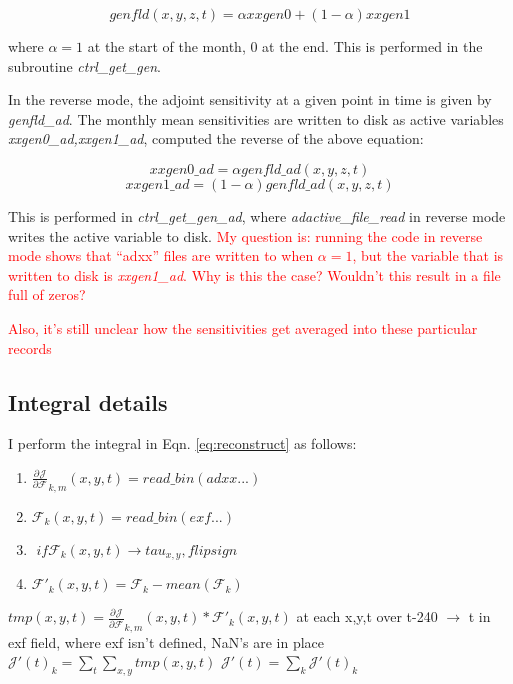 \documentclass[a4paper,11pt]{article}
\newcommand{\pderiv}[3][]{%
  \ensuremath{\frac{\partial^{#1} {#2}}{\partial {#3}^{#1}}}}
\newcommand{\red}[1]{\textcolor{red}{#1}}
\begin{document}
	\begin{equation}
	  genfld(x,y,z,t) = \alpha xxgen0 + (1-\alpha) xxgen1
	\end{equation}

  where $\alpha=1$ at the start of the month, 0 at the end. This is performed in the subroutine \textit{ctrl\_get\_gen}.

  In the reverse mode, the adjoint sensitivity at a given point in time is given by \textit{genfld\_ad}. The monthly mean sensitivities are written to disk as active variables \textit{xxgen0\_ad,xxgen1\_ad}, computed the reverse of the above equation: 

	\begin{equation}
	  xxgen0\_ad = \alpha genfld\_ad(x,y,z,t)
	\end{equation}
	\begin{equation}
	  xxgen1\_ad = (1-\alpha) genfld\_ad(x,y,z,t) 
	\end{equation}

   
  This is performed in \textit{ctrl\_get\_gen\_ad}, where \textit{adactive\_file\_read} in reverse mode writes the active variable to disk. \red{My question is: running the code in reverse mode shows that ``adxx'' files are written to when $\alpha = 1$, but the variable that is written to disk is \textit{xxgen1\_ad}. Why is this the case? Wouldn't this result in a file full of zeros?}

  \red{Also, it's still unclear how the sensitivities get averaged into these particular records}

 \subsection{Integral details} 

  I perform the integral in Eqn. \ref{eq:reconstruct} as follows:

 \begin{algorithm}
 \begin{algorithmic}
    \STATE
	\STATE
	\begin{enumerate}
	  \item $\pderiv{\mathcal{J}}{\mathcal{F}}_{k,m}(x,y,t) = read\_bin(adxx...)$
	  \item $\mathcal{F}_{k}(x,y,t) = read\_bin(exf...)$
	  \item $\,\, if \mathcal{F}_k(x,y,t) \rightarrow tau_{x,y}, flip sign $
	  \item $\mathcal{F}'_{k}(x,y,t) = \mathcal{F}_k - mean( \mathcal{F}_k ) $
	\end{enumerate}
	\STATE
		\STATE
		\STATE $ tmp(x,y,t) = \pderiv{\mathcal{J}}{\mathcal{F}}_{k,m}(x,y,t)*\mathcal{F}'_{k}(x,y,t)$ 
		\STATE at each x,y,t over t-240 $\rightarrow$ t in exf field, where exf isn't defined, NaN's are in place
		\STATE
		\STATE $\mathcal{J}'(t)_k = \sum_t\sum_{x,y} tmp(x,y,t)$
		\STATE
	  \ENDFOR
    \ENDFOR
    \STATE $\mathcal{J}'(t) = \sum_k \mathcal{J}'(t)_k$
  \ENDFOR
 \end{algorithmic}
 \end{algorithm} 
\end{document}
